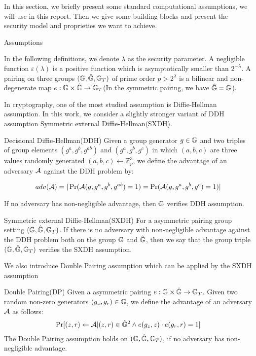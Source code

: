 In this section, we briefly present some standard computational assumptions, we will use in this report.  
Then we give some building blocks and present the security model and proprieties we want to achieve.

\begin{subsection}{Assumptions}
  
  In the following definitions, we denote $\lambda$ as the security parameter.
  A negligible function $\varepsilon(\lambda)$ is a positive function which is asymptotically smaller than $2^{-\lambda}$.
  A pairing on three groups $(\mathbb{G}, \hat{\mathbb{G}}, \mathbb{G}_T)$ of prime order $p > 2^\lambda$ is a bilinear and non-degenerate map $e : \mathbb{G} \times \hat{\mathbb{G}} \to \mathbb{G}_T$(In the symmetric pairing, we have $\hat{\mathbb{G}} = \mathbb{G}$). 
  
  In cryptography, one of the most studied assumption is Diffie-Hellman assumption. In this work, we consider a slightly stronger variant of DDH assumption Symmetric external Diffie-Hellman(SXDH).

  \begin{myDef}{Decisional Diffie-Hellman(DDH)}
    Given a group generator $g \in \mathbb{G}$ and two triples of group elements $(g^a, g^b, g^{ab})$ and $(g^a, g^b, g^c)$ in which $(a, b, c)$ are three values randomly generated  $(a, b, c) \gets \mathbb{Z}_p^3$, we define the advantage of an adversary $\mathcal{A}$ against the DDH problem by:

    \begin{align*}
      adv(\mathcal{A}) = |\operatorname{Pr}(\mathcal{A}(g, g^a, g^b, g^{ab}) = 1) = \operatorname{Pr}(\mathcal{A}(g, g^a, g^b, g^c) = 1)|
    \end{align*}

    If no adversary has non-negligible advantage, then $\mathbb{G}$ verifies DDH assumption.
  \end{myDef}

  \begin{myDef}{Symmetric external Diffie-Hellman(SXDH)}
    For a asymmetric pairing group setting $(\mathbb{G}, \hat{\mathbb{G}}, \mathbb{G}_T)$. If there is no adversary with non-negligible advantage against the DDH problem both on the group $\mathbb{G}$ and $\hat{\mathbb{G}}$, then we say that the group triple $(\mathbb{G}, \hat{\mathbb{G}}, \mathbb{G}_T)$ verifies the SXDH assumption.
  \end{myDef}

  We also introduce Double Pairing assumption which can be applied by the SXDH assumption
  
  \begin{myDef}{Double Pairing(DP)}
    Given a asymmetric pairing $e:\mathbb{G} \times \hat{\mathbb{G}} \to \mathbb{G}_T$. Given two random non-zero generators $(g_z, g_r) \in \mathbb{G}$, we define the advantage of an adversary $\mathcal{A}$ as follows:
    \begin{align*}
      \operatorname{Pr}[(z, r) \gets \mathcal{A}| (z, r)\in \hat{\mathbb{G}}^2 \wedge e(g_z, z) \cdot e(g_r, r) = 1]
    \end{align*}
    The Double Pairing assumption holds on $(\mathbb{G}, \hat{\mathbb{G}}, \mathbb{G}_T)$, if no adversary has non-negligible advantage.
  \end{myDef}


\end{subsection}
